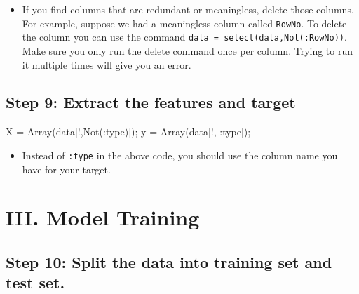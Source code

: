 \documentclass[
  letterpaper,
]{book}
\newenvironment{Shaded}{\begin{snugshade}}{\end{snugshade}}
\newcommand{\FunctionTok}[1]{\textcolor[rgb]{0.28,0.35,0.67}{#1}}
\newcommand{\NormalTok}[1]{\textcolor[rgb]{0.00,0.23,0.31}{#1}}
\newcommand{\OperatorTok}[1]{\textcolor[rgb]{0.37,0.37,0.37}{#1}}
\providecommand{\tightlist}{%
  \setlength{\itemsep}{0pt}\setlength{\parskip}{0pt}}\usepackage{longtable,booktabs,array}
\begin{document}
\begin{itemize}
\tightlist
\item
  If you find columns that are redundant or meaningless, delete those
  columns. For example, suppose we had a meaningless column called
  \texttt{RowNo}. To delete the column you can use the command
  \texttt{data\ =\ select(data,Not(:RowNo))}. Make sure you only run the
  delete command once per column. Trying to run it multiple times will
  give you an error.
\end{itemize}

\hypertarget{step-9-extract-the-features-and-target}{%
\subsection*{Step 9: Extract the features and
target}\label{step-9-extract-the-features-and-target}}

\begin{Shaded}
\begin{Highlighting}[]
\NormalTok{X }\OperatorTok{=} \FunctionTok{Array}\NormalTok{(data[!,}\FunctionTok{Not}\NormalTok{(}\OperatorTok{:}\NormalTok{type)]);}
\NormalTok{y }\OperatorTok{=} \FunctionTok{Array}\NormalTok{(data[!, }\OperatorTok{:}\NormalTok{type]);}
\end{Highlighting}
\end{Shaded}

\begin{itemize}
\tightlist
\item
  Instead of \texttt{:type} in the above code, you should use the column
  name you have for your target.
\end{itemize}

\hypertarget{iii.-model-training}{%
\section*{III. Model Training}\label{iii.-model-training}}

\hypertarget{step-10-split-the-data-into-training-set-and-test-set.}{%
\subsection*{Step 10: Split the data into training set and test
set.}\label{step-10-split-the-data-into-training-set-and-test-set.}}
\end{document}
